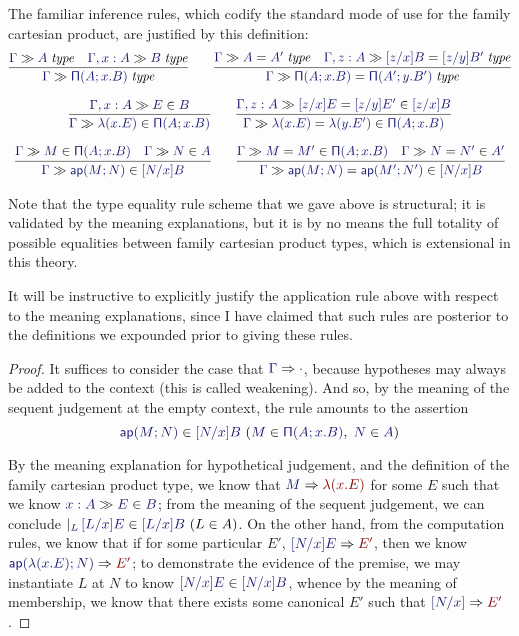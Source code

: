 \documentclass[main.tex]{subfiles}
\begin{document}
The familiar inference rules, which codify the standard mode of use for the
family cartesian product, are justified by this definition:
\begin{gather*}
  \infer{
    \sequent\Gamma\isset{\typrod{A}{x}{B}}
  }{
    \sequent\Gamma\isset{A} &
    \sequent{\Gamma,x:A}{\isset{B}}
  }\qquad
  \infer{
    \sequent\Gamma\eisset{\typrod{A}{x}{B}}{\typrod{A'}{y}{B'}}
  }{
    \sequent\Gamma\eisset{A}{A'} &
    \sequent{\Gamma,z:A}{\eisset{[z/x]B}{[z/y]B'}}
  }\\[6pt]
  \infer{
    \sequent\Gamma\ver{\lam{x}{E}}{\typrod{A}{x}{B}}
  }{
    \sequent{\Gamma,x:A}{\ver{E}{B}}
  }\qquad
  \infer{
    \sequent\Gamma\ever{\lam{x}{E}}{\lam{y}{E'}}{\typrod{A}{x}{B}}
  }{
    \sequent{\Gamma,z:A}{\ever{[z/x]E}{[z/y]E'}{[z/x]B}}
  }\\[6pt]
  \infer{
    \sequent\Gamma\ver{\ap{M}{N}}{[N/x]B}
  }{
    \sequent\Gamma\ver{M}{\typrod{A}{x}{B}} &
    \sequent\Gamma\ver{N}{A}
  }\qquad
  \infer{
    \sequent\Gamma\ever{\ap{M}{N}}{\ap{M'}{N'}}{[N/x]B}
  }{
    \sequent\Gamma\ever{M}{M'}{\typrod{A}{x}{B}} &
    \sequent\Gamma\ever{N}{N'}{A'}
  }
\end{gather*}

Note that the type equality rule scheme that we gave above is structural; it is
validated by the meaning explanations, but it is by no means the full totality
of possible equalities between family cartesian product types, which is
extensional in this theory.

It will be instructive to explicitly justify the application rule above with
respect to the meaning explanations, since I have claimed that such rules are
posterior to the definitions we expounded prior to giving these rules.

\begin{proof}
It suffices to consider the case that $\reduce{\Gamma}{\cdot}$,
because hypotheses may always be added to the context (this is called
weakening). And so, by the meaning of the sequent judgement at the
empty context, the rule amounts to the assertion
\[
  \hyp{
    \ver{\ap{M}{N}}{[N/x]B}
  }{
    \ver{M}{\typrod{A}{x}{B}},\; \ver{N}{A}
  }
\]

By the meaning explanation for hypothetical judgement, and the
definition of the family cartesian product type, we know that
$\reduce{M}{\lam{x}{E}}$ for some $E$ such that we know
$\sequent{x:A}{\ver{E}{B}}$; from the meaning of the sequent
judgement, we can conclude $\genj{L}{\hyp{\ver{[L/x]E}{[L/x]B}}{L\in
A}}$. On the other hand, from the computation rules, we know that if
for some particular $E'$, $\reduce{[N/x]E}{E'}$, then we know
$\reduce{\ap{\lam{x}{E}}{N}}{E'}$; to demonstrate the evidence of the
premise, we may instantiate $L$ at $N$ to know $\ver{[N/x]E}{[N/x]B}$,
whence by the meaning of membership, we know that there exists some
canonical $E'$ such that $\reduce{[N/x]}{E'}$.
\end{proof}
\end{document}
